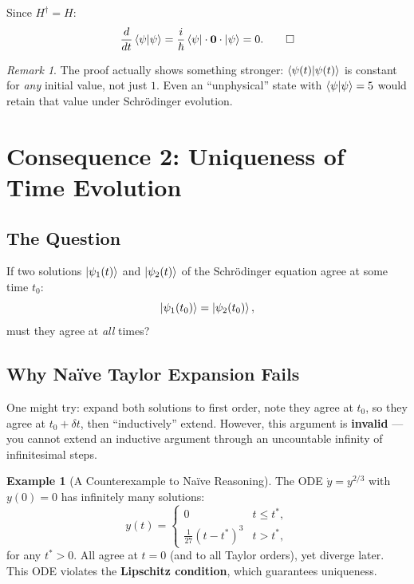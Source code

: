 \documentclass[11pt,a4paper]{article}
\theoremstyle{definition}
\newtheorem{example}{Example}[section]
\theoremstyle{plain}
\theoremstyle{remark}
\newtheorem{remark}{Remark}[section]
\begin{document}
Since $H^\dagger = H$:
\[
    \frac{d}{dt}\braket{\psi}{\psi} = \frac{i}{\hbar}\bra{\psi}\cdot\mathbf{0}\cdot\ket{\psi} = 0. \qed
\]

\begin{remark}
    The proof actually shows something stronger: $\braket{\psi(t)}{\psi(t)}$ is constant for \emph{any} initial value, not just $1$. Even an ``unphysical'' state with $\braket{\psi}{\psi} = 5$ would retain that value under Schr\"odinger evolution.
\end{remark}

\section{Consequence 2: Uniqueness of Time Evolution}

\subsection{The Question}

If two solutions $\ket{\psi_1(t)}$ and $\ket{\psi_2(t)}$ of the Schr\"odinger equation agree at some time $t_0$:
\[
    \ket{\psi_1(t_0)} = \ket{\psi_2(t_0)},
\]
must they agree at \emph{all} times?

\subsection{Why Na\"ive Taylor Expansion Fails}

One might try: expand both solutions to first order, note they agree at $t_0$, so they agree at $t_0 + \delta t$, then ``inductively'' extend. However, this argument is \textbf{invalid} --- you cannot extend an inductive argument through an uncountable infinity of infinitesimal steps.

\begin{example}[A Counterexample to Na\"ive Reasoning]
    The ODE $\dot{y} = y^{2/3}$ with $y(0) = 0$ has infinitely many solutions:
    \[
        y(t) = \begin{cases}0 & t \leq t^*, \\ \frac{1}{27}(t - t^*)^3 & t > t^*,\end{cases}
    \]
    for any $t^* > 0$. All agree at $t = 0$ (and to all Taylor orders), yet diverge later. This ODE violates the \textbf{Lipschitz condition}, which guarantees uniqueness.
\end{example}
\end{document}
